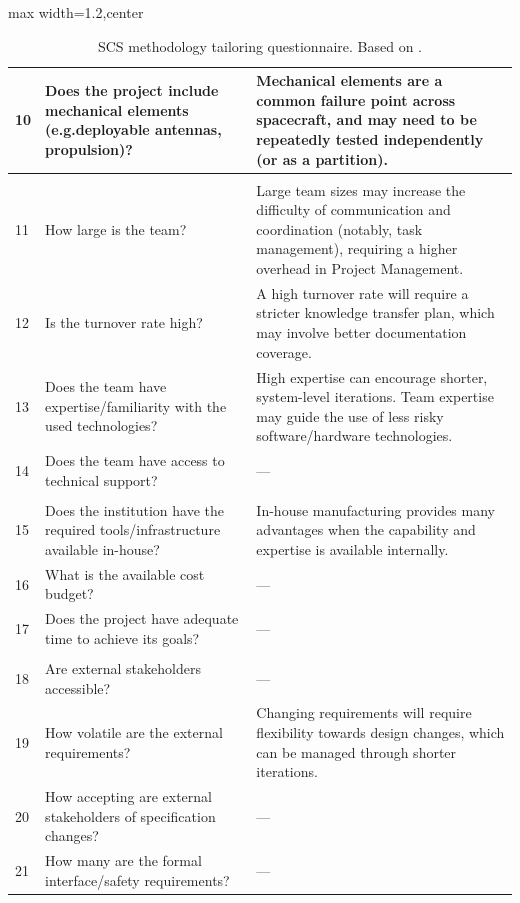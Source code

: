 \documentclass[a4paper,nobib,justified,final]{tufte-book}
\begin{document}
\begin{table}[p]
\begin{adjustbox}{max width=1.2\textwidth,center}
\begin{tabularx}{1.2\textwidth}{lp{7cm}>{\small}X}
	10 & Does the project include mechanical   elements (e.g.\@ deployable antennas, propulsion)? & Mechanical elements are a common failure point across spacecraft, and may need to be repeatedly tested independently (or as a partition). \\ \midrule
	\rowcolor{white}
	\multicolumn{2}{l}{\textbf{Team}} &  \\ \midrule
	11 & How large is the team? & Large team sizes may increase the difficulty of communication and coordination (notably, task management), requiring a higher overhead in Project Management. \\
	12 & Is the turnover rate high? & A high turnover rate will require a stricter knowledge transfer plan, which may involve better documentation coverage. \\
	13 & Does the team have expertise/familiarity   with the used technologies? & High expertise can encourage shorter, system-level iterations. Team expertise may guide the use of less risky software/hardware technologies. \\
	14 & Does the team have access to technical   support? & --- \\ \midrule
	\rowcolor{white}
	\multicolumn{2}{l}{\textbf{Internal Environment}} &  \\ \midrule
	15 & Does the institution have the required tools/infrastructure available in-house? & In-house manufacturing provides many advantages when the capability and expertise is available internally. \\
	16 & What is the available cost budget? & --- \\
	17 & Does the project have adequate time to achieve its goals? & --- \\ \midrule
	\rowcolor{white}
	\multicolumn{2}{l}{\textbf{External Environment}} & \\ \midrule
	18 & Are external stakeholders accessible? & --- \\
	19 & How volatile are the external   requirements? & Changing requirements will require flexibility towards design changes, which can be managed through shorter iterations. \\
	20 & How accepting are external stakeholders   of specification changes? & --- \\
	21 & How many are the formal interface/safety   requirements? & --- \\ \bottomrule
	\end{tabularx}
	\end{adjustbox}
	\caption[SCS methodology tailoring questionnaire]{\acs{SCS} methodology tailoring questionnaire. Based on \cite{xuUsingProcessTailoring2008}.}
\end{table}
\end{document}
